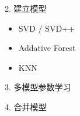 \documentclass{beamer}
\begin{document}
\begin{frame}{2. 建立模型}
    \begin{itemize}
    \item SVD / SVD++
    \item Addative Forest
    \item KNN
    \end{itemize}
\end{frame}

\begin{frame}{3. 多模型参数学习}
\end{frame}

\begin{frame}{4. 合并模型}
\end{frame}
\end{document}
